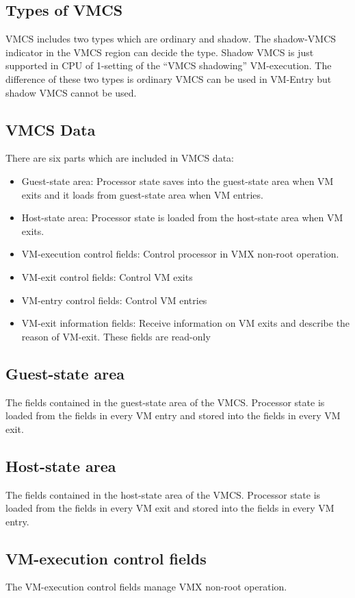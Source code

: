 \documentclass[10pt,draftclsnofoot,peerreview ,letterpaper,onecolumn,]{IEEEtran}
\begin{document}
	\subsection{Types of VMCS}
	VMCS includes two types which are ordinary and shadow. The shadow-VMCS indicator in the VMCS region can decide the type. Shadow VMCS is just supported in CPU of 1-setting of the “VMCS shadowing” VM-execution. The difference of these two types is ordinary VMCS can be used in VM-Entry but shadow VMCS cannot be used.
	
	\subsection{VMCS Data}
	There are six parts which are included in VMCS data:
	\begin{itemize}
		\item Guest-state area: Processor state saves into the guest-state area when VM exits and it loads from guest-state area when VM entries.
		\item Host-state area: Processor state is loaded from the host-state area when VM exits.
		\item VM-execution control fields: Control processor in VMX non-root operation. 
		\item VM-exit control fields: Control VM exits
		\item VM-entry control fields: Control VM entries
		\item VM-exit information fields: Receive information on VM exits and describe the reason of VM-exit. These fields are read-only
	\end{itemize}
	
	\subsection{Guest-state area}
	The fields contained in the guest-state area of the VMCS. Processor state is loaded from the fields in every VM entry and stored into the fields in every VM exit.
	
	\subsection{Host-state area}
	The fields contained in the host-state area of the VMCS. Processor state is loaded from the fields in every VM exit and stored into the fields in every VM entry.
	
	\subsection{VM-execution control fields}
    The VM-execution control fields manage VMX non-root operation.
	
\end{document}
